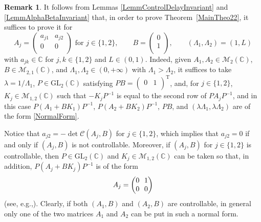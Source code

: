 \documentclass[JEP,XML,SOM,Unicode]{cedram}
\renewcommand{\eg}{e.g.,\xspace}
\theoremstyle{plain}
\theoremstyle{definition}
\newtheorem{remk}[theo]{Remark}
\newcommand{\transp}{{\scriptscriptstyle\mathrm{T}}}
\begin{document}
\begin{remk}
\label{RemkReduction}
It follows from Lemmas \ref{LemmControlDelayInvariant} and \ref{LemmAlphaBetaInvariant} that, in order to prove Theorem~\ref{MainTheo22}, it suffices to prove it for
\begin{equation}
\label{NormalForm}
A_j = \begin{pmatrix}
a_{j1} & a_{j2} \\
0 & 0 \\
\end{pmatrix} \text{ for } j \in \{1, 2\}, \qquad B = \begin{pmatrix}
0 \\
1 \\
\end{pmatrix}, \qquad (\Lambda_1, \Lambda_2) = (1, L)
\end{equation}
with $a_{jk} \in \mathbb C$ for $j, k \in \{1, 2\}$ and $L \in (0, 1)$. Indeed, given $A_1, A_2 \in \mathcal M_2(\mathbb C)$, $B \in \mathcal M_{2, 1}(\mathbb C)$, and $\Lambda_1, \Lambda_2 \in (0, +\infty)$ with $\Lambda_1 > \Lambda_2$, it suffices to take $\lambda = 1/\Lambda_1$, $P \in \mathrm{GL}_2(\mathbb C)$ satisfying $P B = \begin{pmatrix}0 & 1 \\\end{pmatrix}^\transp$, and, for $j \in \{1, 2\}$, $K_j \in \mathcal M_ {1, 2}(\mathbb C)$ such that $-K_j P^{-1}$ is equal to the second row of $P A_j P^{-1}$, and in this case $P(A_1 + B K_1)P^{-1}$, \hbox{$P(A_2 + B K_2)P^{-1}$}, $P B$, and $(\lambda \Lambda_1, \lambda \Lambda_2)$ are of the form \eqref{NormalForm}.

Notice that $a_{j2} = -\det\mathcal C(A_j, B)$ for $j \in \{1, 2\}$, which implies that $a_{j2} =0$ if and only if $(A_j,B)$ is not controllable.
Moreover, if $(A_j,B)$ for $j\in\{1,2\}$ is controllable, then $P \in \mathrm{GL}_2(\mathbb C)$ and $K_j \in \mathcal M_{1, 2}(\mathbb C)$ can be taken so that, in addition,
\hbox{$P (A_j + B K_j) P^{-1}$} is of the form
\begin{equation*}\arraycolsep3.5pt
A_j = \begin{pmatrix}
0 & 1 \\
0 & 0 \\
\end{pmatrix} \end{equation*}
(see, \eg \cite[Def.\,5.1.5]{Sontag1998Mathematical}). Clearly, if both $(A_1,B)$ and $(A_2,B)$ are controllable, in general only one of the two matrices $A_1$ and $A_2$ can be put in such a normal form.


\end{remk}
\end{document}
